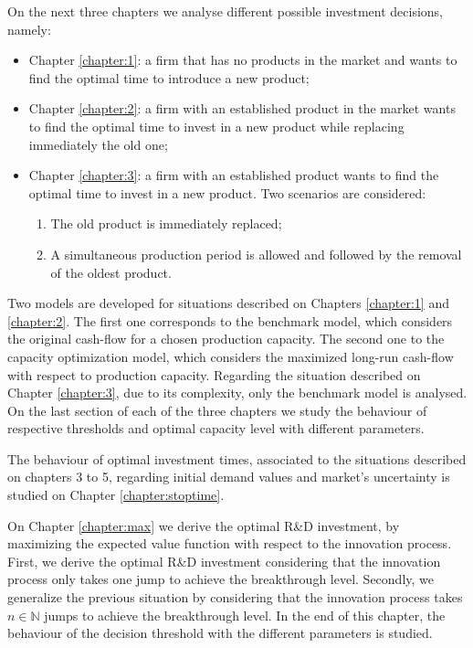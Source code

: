 On the next three chapters we analyse different possible investment decisions, namely:
\begin{itemize}
	\item Chapter \ref{chapter:1}: a firm that has no products in the market and wants to find the optimal time to introduce a new product;
	\item Chapter \ref{chapter:2}: a firm with an established product in the market wants to find the optimal time to invest in a new product while replacing immediately the old one;
	\item Chapter \ref{chapter:3}: a firm with an established product wants to find the optimal time to invest in a new product.
	Two scenarios are considered:
	 \begin{enumerate}
	 	\item The old product is immediately replaced;
	 	\item A simultaneous production period is allowed and followed by the removal of the oldest product.
	 \end{enumerate}
\end{itemize}


Two models are developed for situations described on Chapters \ref{chapter:1} and \ref{chapter:2}. The first one corresponds to the benchmark model, which considers the original cash-flow for a chosen production capacity. The second one to the capacity optimization model, which considers the maximized long-run cash-flow with respect to production capacity. 
Regarding the situation described on Chapter \ref{chapter:3}, due to its complexity, only the benchmark model is analysed.
On the last section of each of the three chapters we study the behaviour of respective thresholds and optimal capacity level with different parameters.


The behaviour of optimal investment times, associated to the situations described on chapters 3 to 5, regarding initial demand values and market's uncertainty is studied on Chapter \ref{chapter:stoptime}.



On Chapter \ref{chapter:max} we derive the optimal R\&D investment, by maximizing the expected value function with respect to the innovation process. 
First, we derive the optimal R\&D investment considering that the innovation process only takes one jump to achieve the breakthrough level.
Secondly, we generalize the previous situation by considering that the innovation process takes $n \in \mathds{N}$ jumps to achieve the breakthrough level.
In the end of this chapter, the behaviour of the decision threshold with the different parameters is studied.



